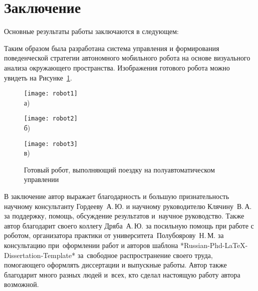 \chapter*{Заключение}                       %


Основные результаты работы заключаются в следующем:

Таким образом была разработана система управления и формирования поведенческой стратегии автономного мобильного робота на основе визуального анализа окружающего пространства. Изображения готового робота можно увидеть на Рисунке~\cref{fig:done}.

\begin{figure}[ht]
    \begin{minipage}[b][][b]{0.32\linewidth}\centering
        \texttt{[image: robot1]} \\ а)
    \end{minipage}
    \hfill
    \begin{minipage}[b][][b]{0.32\linewidth}\centering
        \texttt{[image: robot2]} \\ б)
    \end{minipage}
    \hfill
    \begin{minipage}[b][][b]{0.32\linewidth}\centering
        \texttt{[image: robot3]} \\ в)
    \end{minipage}
    \caption{Готовый робот, выполняющий поездку на полуавтоматическом управлении}
    \label{fig:done}
\end{figure}

В заключение автор выражает благодарность и большую признательность научному консультанту Гордееву~А.\,Ю. и научному руководителю Клячину~В.\,А. за поддержку, помощь, обсуждение результатов и~научное руководство. Также автор благодарит своего коллегу Дряба~А.\,Ю. за посильную помощь при работе с роботом, организатора практики от университета~Полубоярову~Н.\,М. за консультацию при~оформлении работ и авторов шаблона *Russian-Phd-LaTeX-Dissertation-Template* за~свободное распространение своего труда, помогающего оформлять диссертации и выпускные работы. Автор также благодарит много разных людей и~всех, кто сделал настоящую работу автора возможной.
